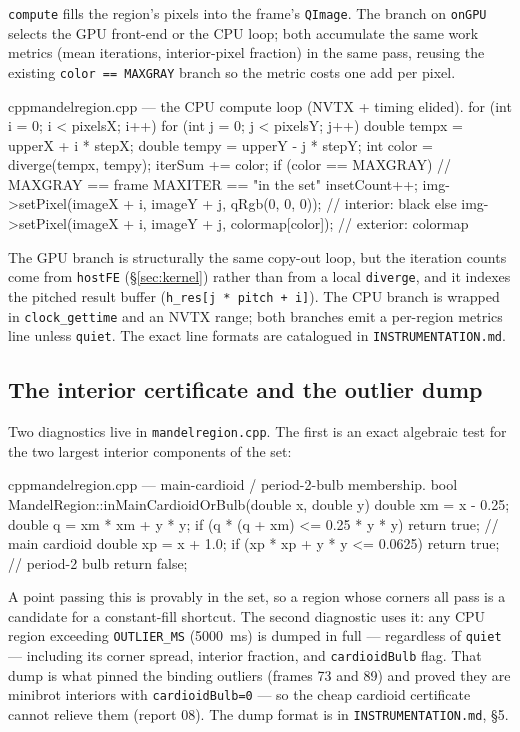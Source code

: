 \documentclass[
	english,
	letterpaper, oneside
]{article}
\begin{document}
\texttt{compute} fills the region's pixels into the frame's \texttt{QImage}. The
branch on \texttt{onGPU} selects the GPU front-end or the CPU loop; both
accumulate the same work metrics (mean iterations, interior-pixel fraction) in the
same pass, reusing the existing \texttt{color == MAXGRAY} branch so the metric
costs one add per pixel.

\begin{sourcecode}{cpp}{mandelregion.cpp --- the CPU compute loop (NVTX + timing elided).}
for (int i = 0; i < pixelsX; i++)
  for (int j = 0; j < pixelsY; j++) {
    double tempx = upperX + i * stepX;
    double tempy = upperY - j * stepY;
    int color = diverge(tempx, tempy);
    iterSum += color;
    if (color == MAXGRAY) {            // MAXGRAY == frame MAXITER == "in the set"
        insetCount++;
        img->setPixel(imageX + i, imageY + j, qRgb(0, 0, 0));   // interior: black
    } else
        img->setPixel(imageX + i, imageY + j, colormap[color]); // exterior: colormap
  }
\end{sourcecode}

The GPU branch is structurally the same copy-out loop, but the iteration counts
come from \texttt{hostFE} (\S\ref{sec:kernel}) rather than from a local
\texttt{diverge}, and it indexes the pitched result buffer
(\texttt{h\_res[j * pitch + i]}). The CPU branch is wrapped in
\texttt{clock\_gettime} and an NVTX range; both branches emit a per-region metrics
line unless \texttt{quiet}. The exact line formats are catalogued in
\texttt{INSTRUMENTATION.md}.

\subsection{The interior certificate and the outlier dump}

Two diagnostics live in \texttt{mandelregion.cpp}. The first is an exact algebraic
test for the two largest interior components of the set:

\begin{sourcecode}{cpp}{mandelregion.cpp --- main-cardioid / period-2-bulb membership.}
bool MandelRegion::inMainCardioidOrBulb(double x, double y) {
  double xm = x - 0.25;
  double q  = xm * xm + y * y;
  if (q * (q + xm) <= 0.25 * y * y) return true;   // main cardioid
  double xp = x + 1.0;
  if (xp * xp + y * y <= 0.0625)    return true;    // period-2 bulb
  return false;
}
\end{sourcecode}

A point passing this is provably in the set, so a region whose corners all pass is
a candidate for a constant-fill shortcut. The second diagnostic uses it: any CPU
region exceeding \texttt{OUTLIER\_MS} (5000~ms) is dumped in full --- regardless of
\texttt{quiet} --- including its corner spread, interior fraction, and
\texttt{cardioidBulb} flag. That dump is what pinned the binding outliers (frames
73 and 89) and proved they are minibrot interiors with
\texttt{cardioidBulb=0} --- so the cheap cardioid certificate cannot relieve them
(report 08). The dump format is in \texttt{INSTRUMENTATION.md}, \S5.
\end{document}
